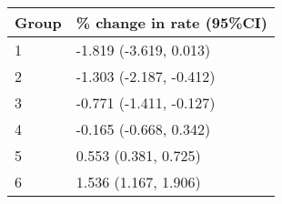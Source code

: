 \begin{tabular}{ll}
  \hline
Group & \% change in rate (95\%CI) \\ 
  \hline
   1 & -1.819 (-3.619, 0.013) \\ 
     2 & -1.303 (-2.187, -0.412) \\ 
     3 & -0.771 (-1.411, -0.127) \\ 
     4 & -0.165 (-0.668, 0.342) \\ 
     5 & 0.553 (0.381, 0.725) \\ 
     6 & 1.536 (1.167, 1.906) \\ 
   \hline
\end{tabular}

